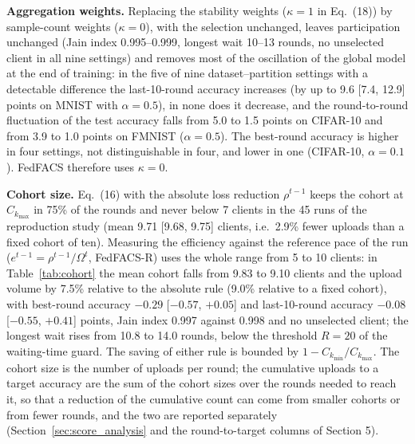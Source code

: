 \documentclass[pdflatex,sn-mathphys-num,oneside]{sn-jnl}%
\theoremstyle{thmstyleone}%
\theoremstyle{thmstyletwo}%
\theoremstyle{thmstylethree}%
\begin{document}
\textbf{Aggregation weights.} Replacing the stability weights ($\kappa=1$ in Eq.~(18)) by sample-count weights ($\kappa=0$), with the selection unchanged, leaves participation unchanged (Jain index 0.995--0.999, longest wait 10--13 rounds, no unselected client in all nine settings) and removes most of the oscillation of the global model at the end of training: in the five of nine dataset--partition settings with a detectable difference the last-10-round accuracy increases (by up to 9.6 [7.4, 12.9] points on MNIST with $\alpha=0.5$), in none does it decrease, and the round-to-round fluctuation of the test accuracy falls from 5.0 to 1.5 points on CIFAR-10 and from 3.9 to 1.0 points on FMNIST ($\alpha=0.5$). The best-round accuracy is higher in four settings, not distinguishable in four, and lower in one (CIFAR-10, $\alpha=0.1$). FedFACS therefore uses $\kappa=0$.

\textbf{Cohort size.} Eq.~(16) with the absolute loss reduction $\rho^{t-1}$ keeps the cohort at $C_{k_{\max}}$ in 75\% of the rounds and never below 7 clients in the 45 runs of the reproduction study (mean 9.71 [9.68, 9.75] clients, i.e.\ 2.9\% fewer uploads than a fixed cohort of ten). Measuring the efficiency against the reference pace of the run ($e^{t-1}=\rho^{t-1}/\Omega^{t}$, FedFACS-R) uses the whole range from 5 to 10 clients: in Table~\ref{tab:cohort} the mean cohort falls from 9.83 to 9.10 clients and the upload volume by 7.5\% relative to the absolute rule (9.0\% relative to a fixed cohort), with best-round accuracy $-0.29$ [$-0.57$, $+0.05$] and last-10-round accuracy $-0.08$ [$-0.55$, $+0.41$] points, Jain index 0.997 against 0.998 and no unselected client; the longest wait rises from 10.8 to 14.0 rounds, below the threshold $R=20$ of the waiting-time guard. The saving of either rule is bounded by $1-C_{k_{\min}}/C_{k_{\max}}$. The cohort size is the number of uploads per round; the cumulative uploads to a target accuracy are the sum of the cohort sizes over the rounds needed to reach it, so that a reduction of the cumulative count can come from smaller cohorts or from fewer rounds, and the two are reported separately (Section~\ref{sec:score_analysis} and the round-to-target columns of Section 5).
\end{document}
